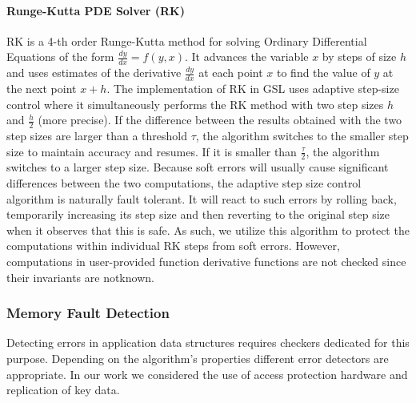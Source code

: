 \documentclass{sig-alternate}
\begin{document}
\paragraph{Runge-Kutta PDE Solver (RK)}
RK is a 4-th order Runge-Kutta method for solving Ordinary Differential Equations of the form $\frac{dy}{dx} = f(y, x)$.
It advances the variable $x$ by steps of size $h$ and uses estimates of the derivative $\frac{dy}{dx}$ at each point $x$ to find the value of $y$ at the next point $x+h$.
The implementation of RK in GSL uses adaptive step-size control where it simultaneously performs the RK method with two step sizes $h$ and $\frac{h}{2}$ (more precise).
If the difference between the results obtained with the two step sizes are larger than a threshold $\tau$, the algorithm switches to the smaller step size to maintain accuracy and resumes.
If it is smaller than $\frac{\tau}{2}$, the algorithm switches to a larger step size.
Because soft errors will usually cause significant differences between the two computations, the adaptive step size control algorithm is naturally fault tolerant.
It will react to such errors by rolling back, temporarily increasing its step size and then reverting to the original step size when it observes that this is safe.
As such, we utilize this algorithm to protect the computations within individual RK steps from soft errors.
However, computations in user-provided function derivative functions are not checked since their invariants are notknown.

\subsubsection{Memory Fault Detection}
\label{sec:res_tech:err_det:mem}

Detecting errors in application data structures requires checkers dedicated for this purpose.
Depending on the algorithm's properties different error detectors are appropriate.
In our work we considered the use of access protection hardware and replication of key data.
\end{document}
